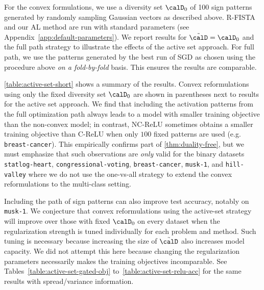 For the convex formulations, we use a diversity set \( \calD_0 \) of 100 sign patterns generated by randomly sampling Gaussian vectors as described above.
R-FISTA and our AL method are run with standard parameters (see Appendix~\ref{app:default-parameters}).
We report results for \( \tilde \calD = \calD_0 \) and the full path strategy to illustrate the effects of the active set approach.
For full path, we use the patterns generated by the best run of SGD as chosen using the procedure above \emph{on a fold-by-fold} basis.
This ensures the results are comparable.

\cref{table:active-set-short} shows a summary of the results.
Convex reformulations using only the fixed diversity set \( \calD_0 \) are shown in parentheses next to results for the active set approach.
We find that including the activation patterns from the full optimization path always leads to a model with smaller training objective than the non-convex model;
in contrast, NC-ReLU sometimes obtains a smaller training objective than C-ReLU when only \( 100 \) fixed patterns are used (e.g. \texttt{breast-cancer}).
This empirically confirms part of \cref{thm:duality-free}, but we must emphasize that such observations are \emph{only} valid for the binary datasets \texttt{statlog-heart}, \texttt{congressional-voting}, \texttt{breast-cancer}, \texttt{musk-1}, and \texttt{hill-valley} where we do not use the one-vs-all strategy to extend the convex reformulations to the multi-class setting.

Including the path of sign patterns can also improve test accuracy, notably on \texttt{musk-1}.
We conjecture that convex reformulations using the active-set strategy will improve over those with fixed \( \calD_0 \) on every dataset when the regularization strength is tuned individually for each problem and method.
Such tuning is necessary because increasing the size of \( \tilde \calD \) also increases model capacity.
We did not attempt this here because changing the regularization parameters necessarily makes the training objectives incomparable.
See Tables~\ref{table:active-set-gated-obj} to~\ref{table:active-set-relu-acc} for the same results with spread/variance information.





